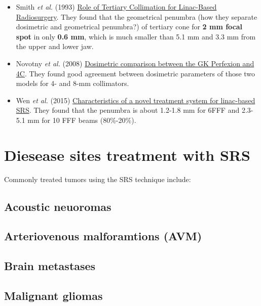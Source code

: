 \documentclass[]{book}
\providecommand{\tightlist}{%
  \setlength{\itemsep}{0pt}\setlength{\parskip}{0pt}}
\theoremstyle{definition}
\theoremstyle{definition}
\theoremstyle{definition}
\theoremstyle{remark}
\begin{document}
\begin{itemize}
\tightlist
\item
  Smith \emph{et al.} (1993)
  \href{http://onlinelibrary.wiley.com/doi/10.1002/roi.2970010111/full}{Role
  of Tertiary Collimation for Linac-Based Radiosurgery}. They found that
  the geometrical penumbra (how they separate dosimetric and geometrical
  penumbra?) of tertiary cone for \textbf{2 mm focal spot} in only
  \textbf{0.6 mm}, which is much smaller than 5.1 mm and 3.3 mm from the
  upper and lower jaw.
\item
  Novotny \emph{et al.} (2008)
  \href{http://thejns.org/doi/pdf/10.3171/JNS/2008/109/12/S3}{Dosimetric
  comparison between the GK Perfexion and 4C}. They found good agreement
  between dosimetric parameters of those two models for 4- and 8-mm
  collimators.
\item
  Wen \emph{et al.} (2015)
  \href{http://onlinelibrary.wiley.com/doi/10.1120/jacmp.v16i4.5313/pdf}{Characteristics
  of a novel treatment system for linac-based SRS}. They found that the
  penumbra is about 1.2-1.8 mm for 6FFF and 2.3-5.1 mm for 10 FFF beams
  (80\%-20\%).
\end{itemize}

\section{Diesease sites treatment with
SRS}\label{diesease-sites-treatment-with-srs}

Commonly treated tumors using the SRS technique include:

\subsection{Acoustic neuoromas}\label{acoustic-neuoromas}

\subsection{Arteriovenous malforamtions
(AVM)}\label{arteriovenous-malforamtions-avm}

\subsection{Brain metastases}\label{brain-metastases}

\subsection{Malignant gliomas}\label{malignant-gliomas}
\end{document}
